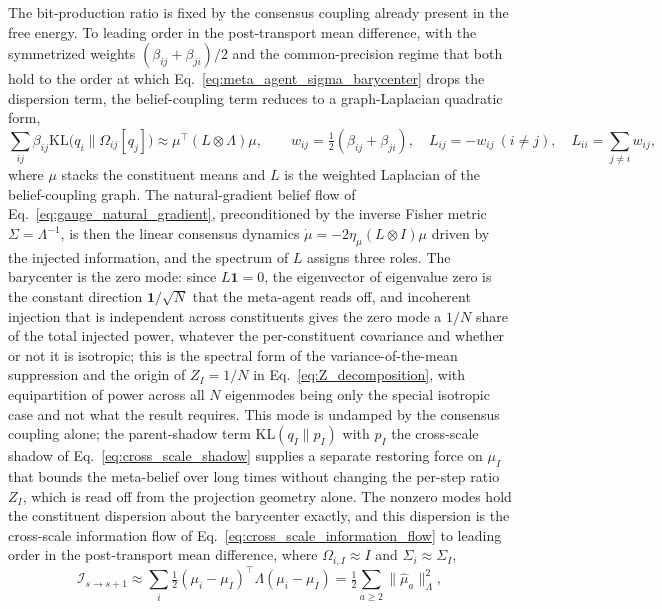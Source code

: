 \documentclass[11pt]{article}
\begin{document}
The bit-production ratio is fixed by the consensus coupling already present in the free energy. To leading order in the post-transport mean difference, with the symmetrized weights $(\beta_{ij}+\beta_{ji})/2$ and the common-precision regime that both hold to the order at which Eq.~\eqref{eq:meta_agent_sigma_barycenter} drops the dispersion term, the belief-coupling term reduces to a graph-Laplacian quadratic form,
\begin{equation}
\sum_{ij}\beta_{ij}\mathrm{KL}\big(q_i \| \Omega_{ij}[q_j]\big) \approx \mu^\top (L \otimes \Lambda)\mu,
\qquad
w_{ij} = \tfrac{1}{2}(\beta_{ij}+\beta_{ji}),\quad L_{ij} = -w_{ij}\ (i\neq j),\quad L_{ii} = \sum_{j\neq i}w_{ij},
\label{eq:coupling_laplacian}
\end{equation}
where $\mu$ stacks the constituent means and $L$ is the weighted Laplacian of the belief-coupling graph. The natural-gradient belief flow of Eq.~\eqref{eq:gauge_natural_gradient}, preconditioned by the inverse Fisher metric $\Sigma = \Lambda^{-1}$, is then the linear consensus dynamics $\dot\mu = -2\eta_\mu (L\otimes I)\mu$ driven by the injected information, and the spectrum of $L$ assigns three roles. The barycenter is the zero mode: since $L\mathbf{1} = 0$, the eigenvector of eigenvalue zero is the constant direction $\mathbf{1}/\sqrt{N}$ that the meta-agent reads off, and incoherent injection that is independent across constituents gives the zero mode a $1/N$ share of the total injected power, whatever the per-constituent covariance and whether or not it is isotropic; this is the spectral form of the variance-of-the-mean suppression and the origin of $Z_I = 1/N$ in Eq.~\eqref{eq:Z_decomposition}, with equipartition of power across all $N$ eigenmodes being only the special isotropic case and not what the result requires. This mode is undamped by the consensus coupling alone; the parent-shadow term $\mathrm{KL}(q_I \| p_I)$ with $p_I$ the cross-scale shadow of Eq.~\eqref{eq:cross_scale_shadow} supplies a separate restoring force on $\mu_I$ that bounds the meta-belief over long times without changing the per-step ratio $Z_I$, which is read off from the projection geometry alone. The nonzero modes hold the constituent dispersion about the barycenter exactly, and this dispersion is the cross-scale information flow of Eq.~\eqref{eq:cross_scale_information_flow} to leading order in the post-transport mean difference, where $\Omega_{i,I}\approx I$ and $\Sigma_i\approx\Sigma_I$,
\begin{equation}
\mathcal{I}_{s\to s+1} \approx \sum_{i} \tfrac{1}{2}(\mu_i - \mu_I)^\top \Lambda (\mu_i - \mu_I) = \tfrac{1}{2}\sum_{a\ge 2}\|\hat\mu_a\|_\Lambda^2,
\label{eq:Ilow_eq_dispersion}
\end{equation}
\end{document}
